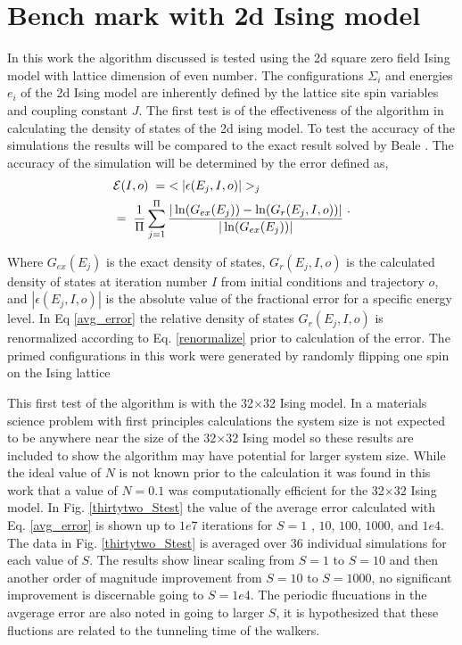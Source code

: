 \documentclass[aps,pre,reprint,superscriptaddress,showkeys]{revtex4-1}
\begin{document}
 

\section{Bench mark with 2d Ising model}
In this work the algorithm discussed is tested using the 2d square zero field  Ising model with lattice dimension of even number\cite{exact_statistical,Onsager,Ising}.  The configurations $\Sigma_i$ and energies $e_i$ of the 2d Ising model are inherently defined by the lattice site spin variables and coupling constant $J$.   The first test is of the effectiveness of the algorithm in calculating the density of states of the 2d ising model.  To test the accuracy of the simulations the results will be compared to the exact result solved by Beale \cite{Beale_2d_ising}. The accuracy of the simulation will be determined by the error defined as, 
\begin{equation}
\begin{split}
 &\mathcal{E}(I,o) \hspace{0.1cm}= \hspace{0.1cm}< |\epsilon(E_j,I,o)| >_j\\
& = \hspace{0.1cm}  \frac{1}{\Pi} \sum_{j=1}^{\Pi}\frac{|\ln(G_{ex}(E_j))- \ln(G_{r}(E_j,I,o))|}{|\ln(G_{ex}(E_j))|}\; 
 \end{split}. 
 \label{avg_error}
\end{equation}

Where $G_{ex}(E_j)$ is the exact density of states, $G_{r}(E_j,I,o)$ is the calculated density of states  at iteration number $I$ from initial conditions and trajectory $o$, and $|\epsilon(E_j,I,o)|$ is the absolute value of the fractional error for a specific energy level. In Eq \ref{avg_error} the relative density of states $G_{r}(E_j,I,o)$ is renormalized according to Eq. \ref{renormalize} prior to calculation of the error.  The primed configurations in this work were generated by randomly flipping one spin on the Ising lattice

This first test of the algorithm is with the 32$\times$32 Ising model. In a materials science problem with first principles calculations the system size is not expected to be anywhere near the size of the  32$\times$32 Ising model so these results are included to show the algorithm may have potential for larger system size. While the ideal value of $N$ is not known prior to the calculation it was found in this work that a value of $N=0.1$ was computationally efficient for the 32$\times$32 Ising model. In Fig. \ref{thirtytwo_Stest} the value of the average error calculated with Eq. \ref{avg_error} is shown up to $1e7$ iterations for $S=1$ , $10$, $100$, $1000$, and $1e4$. The data in Fig. \ref{thirtytwo_Stest} is averaged over 36 individual simulations for each value of $S$. The results show linear scaling from $S=1$ to $S=10$ and then another order of magnitude improvement from $S=10$ to $S=1000$, no significant improvement is discernable going to $S=1e4$.  The periodic flucuations in the avgerage error are also noted in going to larger $S$, it is hypothesized that these fluctions are related to the tunneling time of the walkers. 
\end{document}
